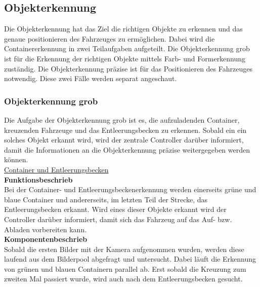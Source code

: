\subsection{Objekterkennung}
Die Objekterkennung hat das Ziel die richtigen Objekte zu erkennen und das genaue positionieren des Fahrzeuges zu ermöglichen. Dabei wird die Containererkennung in zwei Teilaufgaben aufgeteilt. Die Objekterkennung grob ist für die Erkennung der richtigen Objekte mittels Farb- und Formerkennung zuständig. Die Objekterkennung präzise ist für das Positionieren des Fahrzeuges notwendig. Diese zwei Fälle werden separat angeschaut.

\subsubsection{Objekterkennung grob}
Die Aufgabe der Objekterkennung grob ist es, die aufzuladenden Container, kreuzenden Fahrzeuge und das Entleerungsbecken zu erkennen. Sobald ein ein solches Objekt erkannt wird, wird der zentrale Controller darüber informiert, damit die Informationen an die Objekterkennung präzise weitergegeben werden können.
\\[0.2cm]
\underline{Container und Entleerungsbecken}
\\[0.2cm]
\textbf{Funktionsbeschrieb}\\
Bei der Container- und Entleerungsbeckenerkennung werden einerseits grüne und blaue Container und andererseits, im letzten Teil der Strecke, das Entleerungsbecken erkannt. Wird eines dieser Objekte erkannt wird der Controller darüber informiert, damit sich das Fahrzeug auf das Auf- bzw. Abladen vorbereiten kann.
\\[0.2cm]
\textbf{Komponentenbeschrieb}\\
Sobald die ersten Bilder mit der Kamera aufgenommen wurden, werden diese laufend aus dem Bilderpool abgefragt und untersucht. Dabei läuft die Erkennung von grünen und blauen Containern parallel ab. Erst sobald die Kreuzung zum zweiten Mal passiert wurde, wird auch nach dem Entleerungsbecken gesucht.

